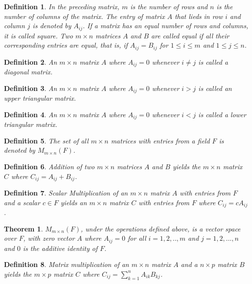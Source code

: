 \documentclass[a4paper]{article}
\newtheorem{mytheorem}{Theorem}
\newtheorem{mydef}{Definition}
\numberwithin{mytheorem}{section}
\numberwithin{mydef}{section}
\numberwithin{example}{section}
\begin{document}
\begin{mydef} In the preceding matrix, $m$ is the number of rows and $n$ is the number of columns of the matrix. The entry of matrix $A$ that lieds in row $i$ and column $j$ is denoted by $A_{ij}$. If a matrix has an equal number of rows and columns, it is called square. Two $m \times n$ matrices $A$ and $B$ are called equal if all their corresponding entries are equal, that is, if $A_{ij} = B_{ij}$ for $1 \leq i \leq m$ and $1 \leq j \leq n$. 
\end{mydef}

\begin{mydef} An $m \times n$ matrix $A$ where $A_{ij} = 0$ whenever $ i \neq j$ is called a diagonal matrix.
\end{mydef}

\begin{mydef} An $m \times n$ matrix $A$ where $A_{ij} = 0$ whenever $ i > j$ is called an upper triangular matrix.
\end{mydef}

\begin{mydef} An $m \times n$ matrix $A$ where $A_{ij} = 0$ whenever $ i < j$ is called a lower triangular matrix.
\end{mydef}

\begin{mydef} The set of all $m \times n$ matrices with entries from a field $F$ is denoted by $M_{m \times n}(F)$.  
\end{mydef}

\begin{mydef} Addition of two $m \times n$ matrices $A$ and $B$ yields the $m \times n$ matrix $C$ where $C_{ij} = A_{ij} + B_{ij}$.  
\end{mydef}

\begin{mydef} Scalar Multiplication of an $m \times n$ matrix $A$ with entries from $F$ and a scalar $c \in F$ yields an $m \times n$ matrix $C$ with entries from $F$ where $C_{ij} = cA_{ij}$. 
\end{mydef}

\begin{mytheorem} $M_{m \times n}(F)$, under the operations defined above, is a vector space over $F$, with zero vector $A$ where $A_{ij} = 0$ for all $i = 1,2,..,m$ and $j = 1,2,...,n$ and $0$ is the additive identity of $F$. \end{mytheorem}

\begin{mydef} Matrix multiplication of an $m \times n$ matrix $A$ and a $n \times p$ matrix $B$ yields the $m \times p$ matrix $C$ where $C_{ij} = \sum^{n}_{k = 1} A_{ik}B_{kj}$.  
\end{mydef}
\end{document}
